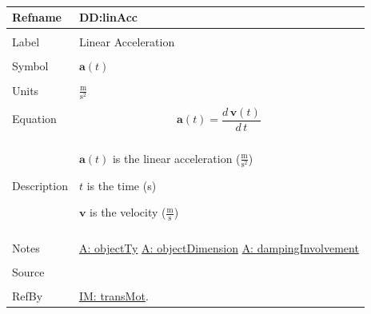 \documentclass[12pt]{article}
\begin{document}
~\newline
 \noindent \begin{minipage}{\textwidth}
\begin{tabular}{p{} p{}}
\toprule \textbf{Refname} & \textbf{DD:linAcc}
\label{DD:linAcc}
\\ \midrule \\
Label & Linear Acceleration
        \\ \midrule \\
        Symbol & $\mathbf{a}(t)$
                 \\ \midrule \\
                 Units & $\frac{\text{m}}{\text{s}^{2}}$
                         \\ \midrule \\
                         Equation & \begin{displaymath}
                                    \mathbf{a}(t)=\frac{d\,\mathbf{v}\left(t\right)}{d\,t}
                                    \end{displaymath}
                                    \\ \midrule \\
                                    Description & \begin{symbDescription}
                                                  \item{$\mathbf{a}(t)$ is the linear acceleration ($\frac{\text{m}}{\text{s}^{2}}$)}
                                                  \item{$t$ is the time (s)}
                                                  \item{$\mathbf{v}$ is the velocity ($\frac{\text{m}}{\text{s}}$)}
                                                  \end{symbDescription}
                                                  \\ \midrule \\
                                                  Notes & \hyperref[A:objectTy]{A: objectTy}
                                                          \hyperref[A:objectDimension]{A: objectDimension}
                                                          \hyperref[A:dampingInvolvement]{A: dampingInvolvement}
                                                          \\ \midrule \\
                                                          Source & \\ \midrule \\
                                                                   RefBy & \hyperref[IM:transMot]{IM: transMot}.
\\ \bottomrule \end{tabular}
\end{minipage}\\
\end{document}
